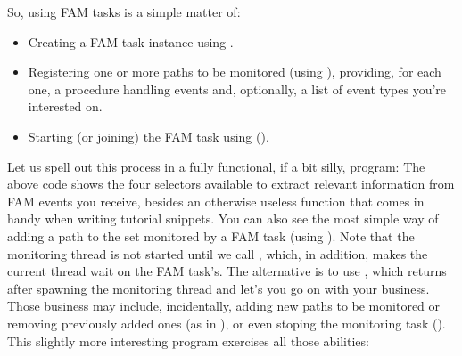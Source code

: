 So, using FAM tasks is a simple matter of:
\begin{itemize}
\item Creating a FAM task instance using .
\item Registering one or more paths to be monitored (using
  ), providing, for each one, a procedure
  handling events and, optionally, a list of event types you're
  interested on.
\item Starting (or joining) the FAM task using 
  ().
\end{itemize}
Let us spell out this process in a fully functional, if a bit silly,
program:
The above code shows the four selectors available to extract relevant
information from FAM events you receive, besides an otherwise useless
function that comes in handy when writing tutorial snippets. You can
also see the most simple way of adding a path to the set monitored by
a FAM task (using ). Note that the monitoring
thread is not started until we call , which, in
addition, makes the current thread wait on the FAM task's. The
alternative is to use , which returns after
spawning the monitoring thread and let's you go on with your business.
Those business may include, incidentally, adding new paths to be
monitored or removing previously added ones (as in
), or even stoping the
monitoring task (). This slightly more
interesting program exercises all those abilities:
